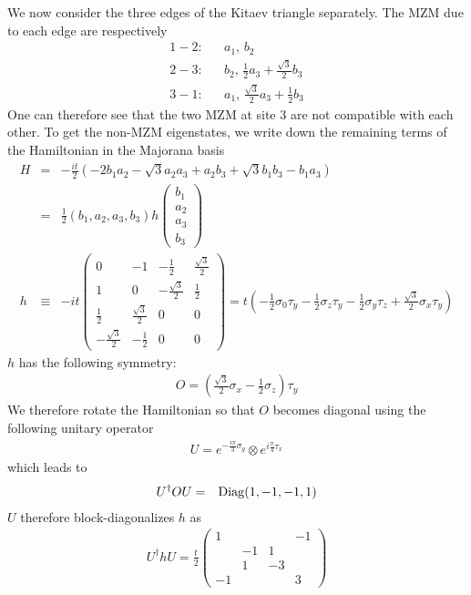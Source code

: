 \documentclass[aps,physrev,amsmath,amssymb]{revtex4-2}
\begin{document}
We now consider the three edges of the Kitaev triangle separately. The MZM due to each edge are respectively
\begin{eqnarray}
	1-2:&& a_1,\,b_2\\\nonumber
	2-3:&& b_2,\,\frac{1}{2}a_3 + \frac{\sqrt{3}}{2}b_3\\\nonumber
	3-1:&& a_1,\, \frac{\sqrt{3}}{2}a_3 + \frac{1}{2} b_3
\end{eqnarray}
One can therefore see that the two MZM at site 3 are not compatible with each other. To get the non-MZM eigenstates, we write down the remaining terms of the Hamiltonian in the Majorana basis
\begin{eqnarray}
	H &=& -\frac{it}{2}\left( -2b_1 a_2 - \sqrt{3} a_2 a_3 + a_2 b_3 + \sqrt{3} b_1 b_3 - b_1 a_3   \right)\\\nonumber
	&=&\frac{1}{2}(b_1, a_2, a_3, b_3)h\begin{pmatrix}
	b_1\\
	a_2\\
	a_3\\
	b_3
\end{pmatrix}\\\nonumber
h&\equiv&-it\begin{pmatrix}
	0 & -1 & -\frac{1}{2} & \frac{\sqrt{3}}{2} \\
	1 & 0 & -\frac{\sqrt{3}}{2} & \frac{1}{2}\\
	\frac{1}{2} & \frac{\sqrt{3}}{2} & 0 & 0 \\
	-\frac{\sqrt{3}}{2} & -\frac{1}{2} & 0 & 0
\end{pmatrix} = t\left( -\frac{1}{2}\sigma_0 \tau_y - \frac{1}{2}\sigma_z\tau_y -\frac{1}{2}\sigma_y \tau_z + \frac{\sqrt{3}}{2} \sigma_x \tau_y \right)
\end{eqnarray}
$h$ has the following symmetry:
\begin{eqnarray}
	O = \left(\frac{\sqrt{3}}{2}\sigma_x - \frac{1}{2}\sigma_z\right) \tau_y
\end{eqnarray}
We therefore rotate the Hamiltonian so that $O$ becomes diagonal using the following unitary operator
\begin{eqnarray}
	U = e^{-\frac{i\pi}{3}\sigma_y}\otimes e^{i\frac{\pi}{4}\tau_x}
\end{eqnarray}
which leads to 
\begin{eqnarray}
	U^\dag O U &=& {\rm Diag}(1,-1,-1,1)
\end{eqnarray}
$U$ therefore block-diagonalizes $h$ as
\begin{eqnarray}
	U^\dag h U = 	\frac{t}{2}\begin{pmatrix}
		1 &  &  & -1 \\
		& -1 & 1 & \\
		& 1 & -3 & \\
		-1 & & & 3 
	\end{pmatrix}
\end{eqnarray}
\end{document}
